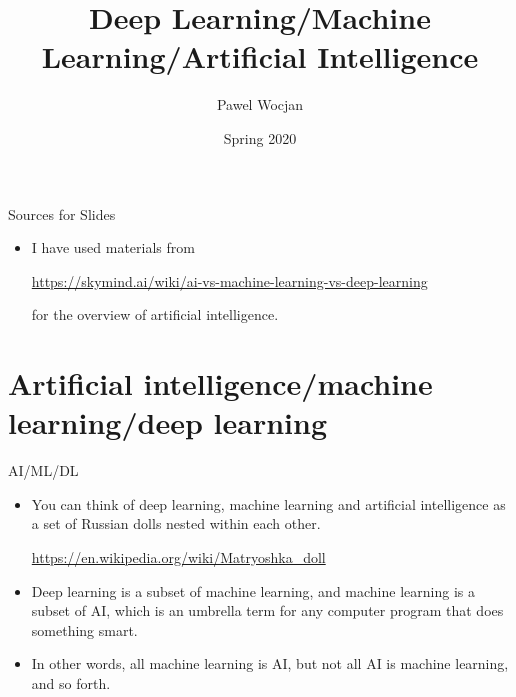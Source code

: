\documentclass{beamer}
\title[AI]{Deep Learning/Machine Learning/Artificial Intelligence}
\author{Pawel Wocjan}
\institute{University of Central Florida}
\date{Spring 2020}
\begin{document}
\begin{frame}
  \titlepage
\end{frame}

\begin{frame}{Sources for Slides}

\begin{itemize}
\item  I have used materials from 

\url{https://skymind.ai/wiki/ai-vs-machine-learning-vs-deep-learning} 

for the overview of artificial intelligence.
\end{itemize}
\end{frame}


\section{Artificial intelligence/machine learning/deep learning}

\begin{frame}{AI/ML/DL}
\begin{itemize}
\item You can think of deep learning, machine learning and artificial intelligence as a set of Russian dolls nested within each other.

\url{https://en.wikipedia.org/wiki/Matryoshka_doll}

\item Deep learning is a subset of machine learning, and machine learning is a subset of AI, which is an umbrella term for any computer program that does something smart. \item In other words, all machine learning is AI, but not all AI is machine learning, and so forth.
\end{itemize}
\end{frame}
\end{document}
